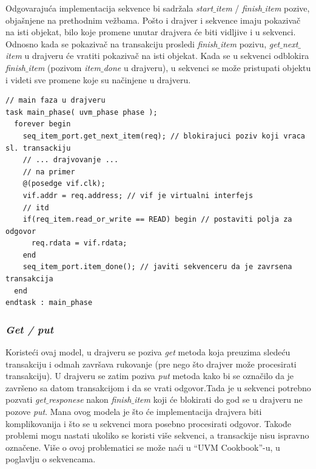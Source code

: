 Odgovarajuća implementacija sekvence bi sadržala \emph{start\(\_\)item} /
\emph{finish\(\_\)item} pozive, objašnjene na prethodnim vežbama. Pošto i
drajver i sekvence imaju pokazivač na isti objekat, bilo koje promene unutar
drajvera će biti vidljive i u sekvenci. Odnosno kada se pokazivač na transakciju
prosledi \emph{finish\(\_\)item} pozivu, \emph{get\(\_\)next\(\_\)item} u
drajveru će vratiti pokazivač na isti objekat. Kada se u sekvenci odblokira
\emph{finish\(\_\)item} (pozivom \emph{item\(\_\)done} u drajveru), u sekvenci
se može pristupati objektu i videti sve promene koje su načinjene u drajveru.

\begin{lstlisting}
// main faza u drajveru
task main_phase( uvm_phase phase );
  forever begin
    seq_item_port.get_next_item(req); // blokirajuci poziv koji vraca sl. transackiju
    // ... drajvovanje ...
    // na primer
    @(posedge vif.clk);
    vif.addr = req.address; // vif je virtualni interfejs
    // itd
    if(req_item.read_or_write == READ) begin // postaviti polja za odgovor
      req.rdata = vif.rdata;
    end
    seq_item_port.item_done(); // javiti sekvenceru da je zavrsena transakcija
  end
endtask : main_phase
\end{lstlisting}

\subsubsection{\emph{Get / put}}

Koristeći ovaj model, u drajveru se poziva \emph{get} metoda koja preuzima
sledeću transakciju i odmah završava rukovanje (pre nego što drajver može
procesirati transakciju). U drajveru se zatim poziva \emph{put} metoda kako bi
se označilo da je završeno sa datom transakcijom i da se vrati odgovor.Tada je u
sekvenci potrebno pozvati \emph{get\(\_\)responese} nakon
\emph{finish\(\_\)item} koji će blokirati do god se u drajveru ne pozove
\emph{put}. Mana ovog modela je što će implementacija drajvera biti
komplikovanija i što se u sekvenci mora posebno procesirati odgovor. Takođe
problemi mogu nastati ukoliko se koristi više sekvenci, a transackije nisu
ispravno označene. Više o ovoj problematici se može naći u ``UVM Cookbook''-u, u
poglavlju o sekvencama.

